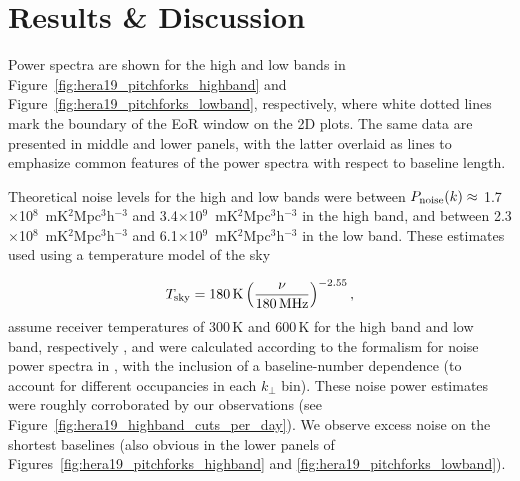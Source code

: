 \section{Results \& Discussion}
\label{sec:hera19_results}


Power spectra are shown for the high and low bands in Figure~\ref{fig:hera19_pitchforks_highband} and Figure~\ref{fig:hera19_pitchforks_lowband}, respectively, where white dotted lines mark the boundary of the EoR window on the 2D plots.  The same data are presented in middle and lower panels, with the latter overlaid as lines to emphasize common features of the power spectra with respect to baseline length. 

Theoretical noise levels for the high and low bands were between 
$P_{\rm noise}(k)\approx$ 1.7$\times$10$^8$ \,mK$^2$Mpc$^3$h$^{-3}$ and 3.4$\times$10$^9$ \,mK$^2$Mpc$^3$h$^{-3}$ in the high band, and between 2.3$\times$10$^8$ \,mK$^2$Mpc$^3$h$^{-3}$ and 6.1$\times$10$^9$ \,mK$^2$Mpc$^3$h$^{-3}$ in the low band. These estimates used using a temperature model of the sky

\begin{equation}
T_{\rm sky} = 180\,{\rm K} \left(\frac{\nu}{180\,{\rm MHz}}\right)^{-2.55},
\end{equation}
assume receiver temperatures of 300\,K and 600\,K for the high band and low band, respectively \citep[][also see the public HERA Memo \# 16]{deBoer.17}, and were calculated according to the formalism for noise power spectra in \cite{Parsons.12a}, with the inclusion of a baseline-number dependence (to account for different occupancies in each $k_{\perp}$ bin).
These noise power estimates were roughly corroborated by our observations (see Figure~\ref{fig:hera19_highband_cuts_per_day}). We observe excess noise on the shortest baselines (also obvious in the lower panels of Figures~\ref{fig:hera19_pitchforks_highband} and \ref{fig:hera19_pitchforks_lowband}). 

